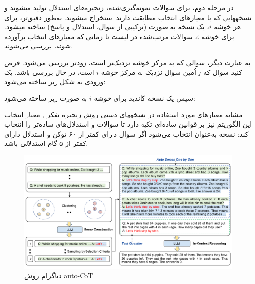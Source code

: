 در مرحله دوم، برای سوالات نمونه‌گیری‌شده، زنجیره‌های استدلال تولید می\/شوند و نسخههایی که با معیارهای انتخاب مطابقت دارند استخراج می\/شوند. به‌طور دقیق‌تر، برای هر خوشه $i$، یک نسخه به صورت  (ترکیبی از سوال، استدلال و پاسخ) ساخته می\/شود. برای خوشه $i$، سوالات مرتب‌شده در لیست  تا زمانی که معیارهای انتخاب برآورده شوند، بررسی می‌شوند.

به عبارت دیگر، سوالی که به مرکز خوشه نزدیک‌تر است، زودتر بررسی می‌شود. فرض کنید سوال  که $j$-اُمین سوال نزدیک به مرکز خوشه $i$ است، در حال بررسی باشد. یک ورودی به شکل زیر ساخته می‌شود:

\begin{center}
	\lr{[Q: $q^{(i)}_j$ A: [P]]}
\end{center}

سپس یک نسخه کاندید برای خوشه $i$ به صورت زیر ساخته می‌شود:

\begin{center}
	\lr{[Q: $q^{(i)}_j$ A: $r^{(i)}_j$ $a^{(i)}_j$]}
\end{center}

مشابه معیارهای مورد استفاده در نسخه\/های دستی روش زنجیره تفکر \cite{CoT}, معیار انتخاب این الگوریتم نیز بر قوانین ساده‌ای تکیه دارد تا سوالات و استدلال‌های ساده‌تر را انتخاب کند: نسخه  به‌عنوان  انتخاب می‌شود اگر سوال  دارای کمتر از ۶۰ توکن و استدلال  دارای کمتر از ۵ گام استدلالی باشد.

\begin{figure}[!t]
	\centering
	\includegraphics[width=140mm]{images/autocot}
	\caption{دیاگرام روش auto-CoT}
	\label{fig_autocot}
\end{figure}

